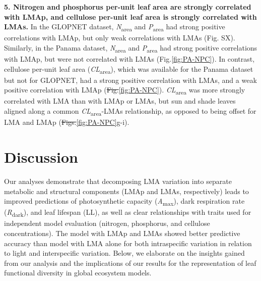 \documentclass[
  12pt,
]{article}
\providecommand{\DIFaddtex}[1]{{\protect\color{blue}\uwave{#1}}} %
\providecommand{\DIFdeltex}[1]{{\protect\color{red}\sout{#1}}}                      %
\providecommand{\DIFaddbegin}{} %
\providecommand{\DIFaddend}{} %
\providecommand{\DIFdelbegin}{} %
\providecommand{\DIFdelend}{} %
\providecommand{\DIFadd}[1]{\texorpdfstring{\DIFaddtex{#1}}{#1}} %
\providecommand{\DIFdel}[1]{\texorpdfstring{\DIFdeltex{#1}}{}} %
\newcommand{\DIFscaledelfig}{0.5}
\newlength{\DIFdelgraphicswidth} %
\newlength{\DIFdelgraphicsheight} %
\newcommand{\DIFaddincludegraphics}[2][]{{\color{blue}\fbox{\DIFOincludegraphics[#1]{#2}}}} %
\newcommand{\DIFdelincludegraphics}[2][]{%
\sbox{\DIFdelgraphicsbox}{\DIFOincludegraphics[#1]{#2}}%
\settoboxwidth{\DIFdelgraphicswidth}{\DIFdelgraphicsbox} %
\settoboxtotalheight{\DIFdelgraphicsheight}{\DIFdelgraphicsbox} %
\scalebox{\DIFscaledelfig}{%
\parbox[b]{\DIFdelgraphicswidth}{\usebox{\DIFdelgraphicsbox}\\[-\baselineskip] \rule{\DIFdelgraphicswidth}{0em}}\llap{\resizebox{\DIFdelgraphicswidth}{\DIFdelgraphicsheight}{%
\setlength{\unitlength}{\DIFdelgraphicswidth}%
\begin{picture}(1,1)%
\thicklines\linethickness{2pt} %
{\color[rgb]{1,0,0}\put(0,0){\framebox(1,1){}}}%
{\color[rgb]{1,0,0}\put(0,0){\line( 1,1){1}}}%
{\color[rgb]{1,0,0}\put(0,1){\line(1,-1){1}}}%
\end{picture}%
}\hspace*{3pt}}} %
} %
\DeclareRobustCommand{\DIFaddbegin}{\DIFOaddbegin \let\includegraphics\DIFaddincludegraphics} %
\DeclareRobustCommand{\DIFaddend}{\DIFOaddend \let\includegraphics\DIFOincludegraphics} %
\DeclareRobustCommand{\DIFdelbegin}{\DIFOdelbegin \let\includegraphics\DIFdelincludegraphics} %
\DeclareRobustCommand{\DIFdelend}{\DIFOaddend \let\includegraphics\DIFOincludegraphics} %
\begin{document}
\textbf{5. Nitrogen and phosphorus per-unit leaf area are strongly correlated with LMAp, and cellulose per-unit leaf area is strongly correlated with LMAs.}
In the GLOPNET dataset, \emph{N}\textsubscript{area} and \emph{P}\textsubscript{area} had strong positive correlations with LMAp, but only weak correlations with LMAs (Fig. SX).
Similarly, in the Panama dataset, \emph{N}\textsubscript{area} and \emph{P}\textsubscript{area} had strong positive correlations with LMAp, but were not correlated with LMAs (Fig.\DIFaddbegin \DIFadd{~}\DIFaddend \ref{fig:PA-NPC}).
In contrast, cellulose per-unit leaf area (\emph{CL}\textsubscript{area}), which was available for the Panama dataset but not for GLOPNET, had a strong positive correlation with LMAs, and a weak positive correlation with LMAp (\DIFdelbegin \DIFdel{Fig.}\DIFdelend \DIFaddbegin \DIFadd{FFig.~}\DIFaddend \ref{fig:PA-NPC}).
\emph{CL}\textsubscript{area} was more strongly correlated with LMA than with LMAp or LMAs, but sun and shade leaves aligned along a common \emph{CL}\textsubscript{area}-LMAs relationship, as opposed to being offset for LMA and LMAp (\DIFdelbegin \DIFdel{Figs.}\DIFdelend \DIFaddbegin \DIFadd{Fig.~}\DIFaddend \ref{fig:PA-NPC}g-i).

\hypertarget{discussion}{%
\section{Discussion}\label{discussion}}

Our analyses demonstrate that decomposing LMA variation into separate metabolic and structural components (LMAp and LMAs, respectively) leads to improved predictions of photosynthetic capacity (\emph{A}\textsubscript{max}), dark respiration rate (\emph{R}\textsubscript{dark}), and leaf lifespan (LL), as well as clear relationships with traits used for independent model evaluation (nitrogen, phosphorus, and cellulose concentrations).
The model with LMAp and LMAs showed better predictive accuracy than model with LMA alone for both intraspecific variation in relation to light and interspecific variation.
Below, we elaborate on the insights gained from our analysis and the implications of our results for the representation of leaf functional diversity in global ecosystem models.
\end{document}
